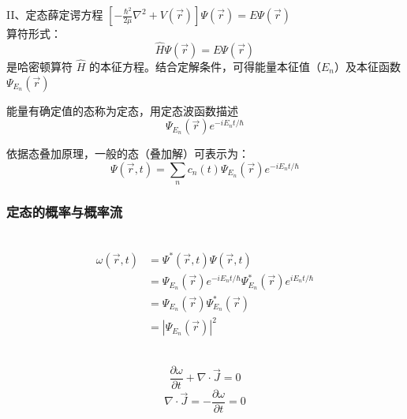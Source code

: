 \begin{frame} 
    II、定态薛定谔方程 $\displaystyle   \left [ -\frac{\hbar^2}{2\mu }\nabla ^2 + V(\vec{r}) \right ]\Psi (\vec{r}) =E \Psi (\vec{r})  $   \\ 
    算符形式：$$\displaystyle   \hat{H} \Psi (\vec{r}) =E \Psi (\vec{r})  $$   
    是哈密顿算符 $\hat{H}$ 的本征方程。结合定解条件，可得能量本征值（$E_n$）及本征函数 $\Psi_{E_n} (\vec{r} )$ \\ \vspace{0.6em}
    \begin{definition}[定态：]
        \hspace{2em}能量有确定值的态称为定态，用定态波函数描述
        \[ \Psi_{E_n} (\vec{r} ) e^{-i E_n t/\hbar} \] 
    \end{definition}
    依据态叠加原理，一般的态（叠加解）可表示为：
    \[ \Psi (\vec{r},t ) =\sum\limits_n c_n(t)\Psi_{E_n} (\vec{r} ) e^{-iE_n t/\hbar}  \]
\end{frame}

\begin{frame} 
    \frametitle{定态的概率与概率流}
    \例[1.试证明定态的概率密度不随时间变化]{}
    \证~
    \begin{equation*}
        \begin{split}
            \omega (\vec{r}, t)&=\Psi^{*}(\vec{r}, t) \Psi(\vec{r}, t) \\
            &=\Psi_{E_n} (\vec{r} ) e^{-iE_n t/\hbar} \Psi_{E_n} ^* (\vec{r} ) e^{iE_n t/\hbar} \\
            &=\Psi_{E_n} (\vec{r} )\Psi_{E_n} ^* (\vec{r} ) \\
            &=|\Psi_{E_n} (\vec{r} )|^2
        \end{split}
    \end{equation*}
\end{frame}

\begin{frame}   
    \例[2.试证明定态的概率流密度不随时间变化]{} 
    \证~ 
    \begin{equation*}
        \frac{\partial \omega}{\partial t }+ \nabla \cdot \vec{J}=0
    \end{equation*}  
    \to
    \begin{equation*}
        \nabla \cdot \vec{J}=-\frac{\partial \omega}{\partial t}=0
    \end{equation*}  
\end{frame}

